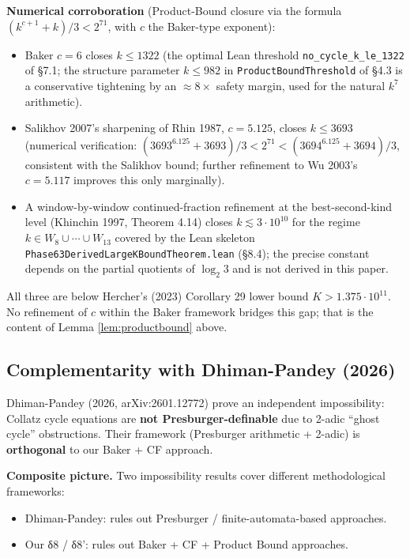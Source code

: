 \documentclass[
  11pt]{amsart}
\providecommand{\tightlist}{%
  \setlength{\itemsep}{0pt}\setlength{\parskip}{0pt}}
\theoremstyle{plain}
\theoremstyle{definition}
\theoremstyle{remark}
\begin{document}
\textbf{Numerical corroboration} (Product-Bound closure via the formula
\((k^{c+1} + k)/3 < 2^{71}\), with \(c\) the Baker-type exponent):

\begin{itemize}
\tightlist
\item
  Baker \(c = 6\) closes \(k \leq 1322\) (the optimal Lean threshold
  \texttt{no\_cycle\_k\_le\_1322} of §7.1; the structure parameter
  \(k \leq 982\) in \texttt{ProductBoundThreshold} of §4.3 is a
  conservative tightening by an \(\approx 8\times\) safety margin, used
  for the natural \(k^7\) arithmetic).
\item
  Salikhov 2007's sharpening of Rhin 1987, \(c = 5.125\), closes
  \(k \leq 3693\) (numerical verification:
  \((3693^{6.125} + 3693)/3 < 2^{71} < (3694^{6.125} + 3694)/3\),
  consistent with the Salikhov bound; further refinement to Wu 2003's
  \(c = 5.117\) improves this only marginally).
\item
  A window-by-window continued-fraction refinement at the
  best-second-kind level (Khinchin 1997, Theorem 4.14) closes
  \(k \lesssim 3 \cdot 10^{10}\) for the regime
  \(k \in W_8 \cup \cdots \cup W_{13}\) covered by the Lean skeleton
  \texttt{Phase63DerivedLargeKBoundTheorem.lean} (§8.4); the precise
  constant depends on the partial quotients of \(\log_2 3\) and is not
  derived in this paper.
\end{itemize}

All three are below Hercher's (2023) Corollary 29 lower bound
\(K > 1.375 \cdot 10^{11}\). No refinement of \(c\) within the Baker
framework bridges this gap; that is the content of Lemma
\ref{lem:productbound} above.

\subsection{Complementarity with Dhiman-Pandey
(2026)}\label{complementarity-with-dhiman-pandey-2026}

Dhiman-Pandey (2026, arXiv:2601.12772) prove an independent
impossibility: Collatz cycle equations are \textbf{not
Presburger-definable} due to 2-adic ``ghost cycle'' obstructions. Their
framework (Presburger arithmetic + 2-adic) is \textbf{orthogonal} to our
Baker + CF approach.

\textbf{Composite picture.} Two impossibility results cover different
methodological frameworks:

\begin{itemize}
\tightlist
\item
  Dhiman-Pandey: rules out Presburger / finite-automata-based
  approaches.
\item
  Our δ8 / δ8': rules out Baker + CF + Product Bound approaches.
\end{itemize}
\end{document}
